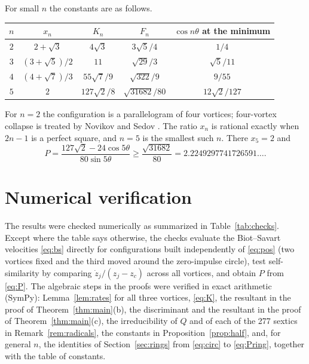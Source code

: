 \documentclass[11pt]{article}
\theoremstyle{definition}
\begin{document}
For small $n$ the constants are as follows.
\begin{center}
\renewcommand{\arraystretch}{1.35}
\begin{tabular}{|c|c|c|c|c|}
  \hline
  $n$ & $x_n$ & $K_n$ & $F_n$ & $\cos n\theta$ at the minimum \\ \hline
  $2$ & $2 + \sqrt{3}$ & $4\sqrt{3}$ & $3\sqrt{5}/4$ & $1/4$ \\ \hline
  $3$ & $(3 + \sqrt{5})/2$ & $11$ & $\sqrt{29}/3$ & $\sqrt{5}/11$ \\ \hline
  $4$ & $(4 + \sqrt{7})/3$ & $55\sqrt{7}/9$ & $\sqrt{322}/9$ & $9/55$ \\ \hline
  $5$ & $2$ & $127\sqrt{2}/8$ & $\sqrt{31682}/80$ & $12\sqrt{2}/127$ \\ \hline
\end{tabular}
\end{center}
For $n = 2$ the configuration is a parallelogram of four vortices; four-vortex collapse is treated by Novikov and Sedov \cite[Sect.~4]{ns1979}. The ratio $x_n$ is rational exactly when $2n - 1$ is a perfect square, and $n = 5$ is the smallest such $n$. There $x_5 = 2$ and
\[
  P = \frac{127\sqrt{2} - 24\cos 5\theta}{80\sin 5\theta} \ge \frac{\sqrt{31682}}{80} = 2.2249297741726591\ldots.
\]

\section{Numerical verification}\label{sec:numerics}

The results were checked numerically as summarized in Table~\ref{tab:checks}. Except where the table says otherwise, the checks evaluate the Biot--Savart velocities \eqref{eq:bs} directly for configurations built independently of \eqref{eq:pos} (two vortices fixed and the third moved around the zero-impulse circle), test self-similarity by comparing $\dot z_j/(z_j - z_c)$ across all vortices, and obtain $P$ from \eqref{eq:P}. The algebraic steps in the proofs were verified in exact arithmetic (SymPy): Lemma~\ref{lem:rates} for all three vortices, \eqref{eq:K}, the resultant in the proof of Theorem~\ref{thm:main}(b), the discriminant and the resultant in the proof of Theorem~\ref{thm:main}(c), the irreducibility of $Q$ and of each of the 277 sextics in Remark~\ref{rem:radicals}, the constants in Proposition~\ref{prop:half}, and, for general $n$, the identities of Section~\ref{sec:rings} from \eqref{eq:circ} to \eqref{eq:Pring}, together with the table of constants.
\end{document}
